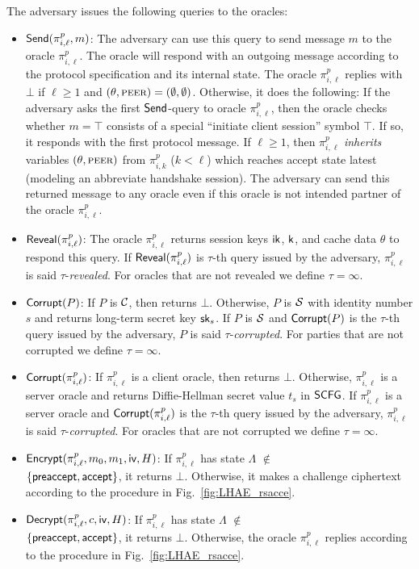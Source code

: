 The adversary issues the following queries to the
oracles:
\begin{itemize}
 \item {$\mathsf{Send}(\pi^p_{i, \ell}, m)$:
 The adversary can use this query to send message
 $m$ to the oracle $\pi^p_{i, \ell}$.
 The oracle will respond with an outgoing message
 according to the protocol specification and its
 internal state.
 The oracle $\pi^p_{i, \ell}$ replies with $\bot$
 if $\ell \geq 1$ and
 $(\theta,\textsc{peer}) = (\emptyset, \emptyset)$.
 Otherwise, it does the following: If the adversary
 asks the first $\mathsf{Send}$-query to oracle
 $\pi^p_{i, \ell}$, then the oracle checks whether
 $m = \top$ consists of a special
 ``initiate client session'' symbol $\top$.
 If so, it responds with the first protocol message.
 If $\ell \geq 1$,
 then $\pi^p_{i,\ell}$ \textit{inherits} variables $(\theta,\textsc{peer})$ from
 $\pi^p_{i, k}$ ($k < \ell$) which reaches accept state latest
 (modeling an abbreviate handshake session).
 The adversary can send this returned message to any
 oracle even if this oracle is not intended partner of
 the oracle $\pi^p_{i, \ell}$.}

 \item {$\mathsf{Reveal}(\pi^p_{i,\ell})$:
 The oracle $\pi^p_{i,\ell}$ returns session keys
 $\mathsf{ik}$, $\mathsf{k}$, and cache data $\theta$ to respond this query.
 If $\mathsf{Reveal}(\pi^p_{i,\ell})$ is $\tau$-th query issued by the adversary,
 $\pi^p_{i,\ell}$ is said $\tau$-\textit{revealed}.
 For oracles that are not revealed we define
 $\tau = \infty$.}

 \item {$\mathsf{Corrupt}(P)$:
 If $P$ is $\mathcal{C}$, then returns $\bot$.
 Otherwise, $P$ is $\mathcal{S}$ with identity number $s$ and returns long-term
 secret key $\mathsf{sk}_s$.
 If $P$ is $\mathcal{S}$ and $\mathsf{Corrupt}(P)$ is the
 $\tau$-th query issued by the adversary, $P$ is said
 $\tau$-\textit{corrupted}.
 For parties that are not corrupted we define
 $\tau = \infty$.}

\item {$\mathsf{Corrupt}(\pi^p_{i,\ell})$:
 If $\pi^p_{i,\ell}$ is a client oracle, then returns $\bot$.
 Otherwise, $\pi^p_{i,\ell}$ is a server oracle and returns
 Diffie-Hellman secret value $t_s$ in $\mathsf{SCFG}$.
 If $\pi^p_{i,\ell}$ is a server oracle and $\mathsf{Corrupt}(\pi^p_{i,\ell})$ is the
 $\tau$-th query issued by the adversary, $\pi^p_{i,\ell}$ is said
 $\tau$-\textit{corrupted}.
 For oracles that are not corrupted we define
 $\tau = \infty$.}

 \item {$\mathsf{Encrypt}(\pi^p_{i,\ell}, m_0, m_1, \mathsf{iv}, H)$:
 If $\pi^p_{i,\ell}$ has state
 $\Lambda$ $\not\in$ \\ $\{\mathsf{preaccept}, \mathsf{accept}\}$,
 it returns $\bot$.
 Otherwise, it makes a challenge ciphertext according to
 the procedure in Fig.~\ref{fig:LHAE_rsacce}.}

 \item {$\mathsf{Decrypt}(\pi^p_{i, \ell}, c, \mathsf{iv}, H)$:
 If $\pi^p_{i,\ell}$ has state
 $\Lambda$ $\not\in$ \\ $\{\mathsf{preaccept}, \mathsf{accept}\}$,
 it returns $\bot$.
 Otherwise, the oracle $\pi^p_{i, \ell}$ replies according to the
 procedure in Fig.~\ref{fig:LHAE_rsacce}.}
\end{itemize}

